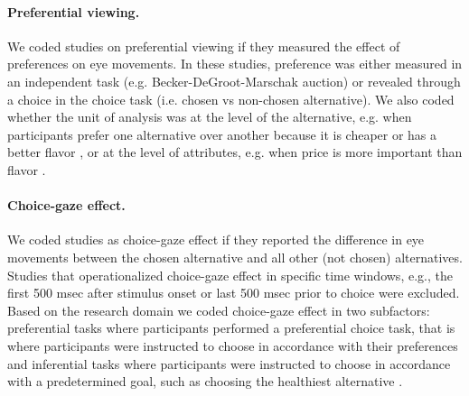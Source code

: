 \paragraph{Preferential viewing.} We coded studies on preferential viewing if they measured the effect of preferences on eye movements. In these studies, preference was either measured in an independent task (e.g. Becker-DeGroot-Marschak auction) or revealed through a choice in the choice task (i.e. chosen vs non-chosen alternative). We also coded whether the unit of analysis was at the level of the alternative, e.g. when participants prefer one alternative over another because it is cheaper or has a better flavor \citep{gidloef2017a}, or at the level of attributes, e.g. when price is more important than flavor \citep{meissner2016a}. 

\paragraph{Choice-gaze effect.} We coded studies as choice-gaze effect if they reported the difference in eye movements between the chosen alternative and all other (not chosen) alternatives. Studies that operationalized choice-gaze effect in specific time windows, e.g., the first 500 msec after stimulus onset or last 500 msec prior to choice \citep{shimojo2003a} were excluded. Based on the research domain we coded choice-gaze effect in two subfactors: preferential tasks where participants performed a preferential choice task, that is where participants were instructed to choose in accordance with their preferences \citep{schotter2010a} and inferential tasks where participants were instructed to choose in accordance with a predetermined goal, such as choosing the healthiest alternative \citep{schotter2012a}. 

